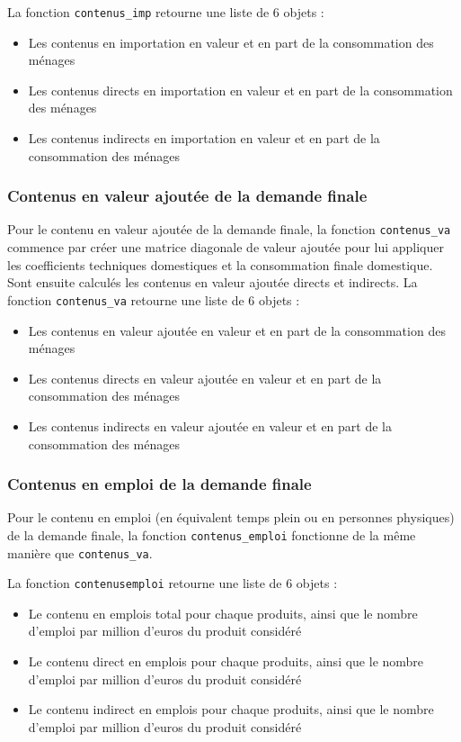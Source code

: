\documentclass[a4paper,french,11pt]{article}
\begin{document}
La fonction \verb|contenus_imp| retourne une liste de 6 objets :
\begin{itemize}
\item Les contenus en importation en valeur et en part de la consommation des ménages
\item Les contenus directs en importation en valeur et en part de la consommation des ménages
\item Les contenus indirects en importation en valeur et en part de la consommation des ménages

\end{itemize}


\subsubsection{Contenus en valeur ajout\'ee de la demande finale}
Pour le contenu en valeur ajout\'ee de la demande finale, la fonction \verb|contenus_va| commence par cr\'eer une matrice diagonale de valeur ajout\'ee pour lui appliquer les coefficients techniques domestiques et la consommation finale domestique. Sont ensuite calcul\'es les contenus en valeur ajout\'ee directs et indirects.
La fonction \verb|contenus_va| retourne une liste de 6 objets :
\begin{itemize}
\item Les contenus en valeur ajout\'ee en valeur et en part de la consommation des ménages
\item Les contenus directs en valeur ajout\'ee en valeur et en part de la consommation des ménages
\item Les contenus indirects en valeur ajout\'ee en valeur et en part de la consommation des ménages

\end{itemize}

\subsubsection{Contenus en emploi de la demande finale}

Pour le contenu en emploi (en \'equivalent temps plein ou en personnes physiques) de la demande finale, la fonction \verb|contenus_emploi| fonctionne de la m\^eme mani\`ere que \verb|contenus_va|. 

La fonction \verb|contenusemploi| retourne une liste de 6 objets :
\begin{itemize}
\item Le contenu en emplois total pour chaque produits, ainsi que le nombre d'emploi par million d'euros du produit consid\'er\'e
\item Le contenu direct en emplois pour chaque produits, ainsi que le nombre d'emploi par million d'euros du produit consid\'er\'e
\item Le contenu indirect en emplois pour chaque produits, ainsi que le nombre d'emploi par million d'euros du produit consid\'er\'e

\end{itemize}
\end{document}
